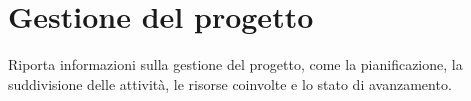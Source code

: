 \chapter{Gestione del progetto} \label{chap:Gestione}
 Riporta informazioni sulla gestione del progetto, come la pianificazione, la suddivisione delle attività, le risorse coinvolte e lo stato di avanzamento.